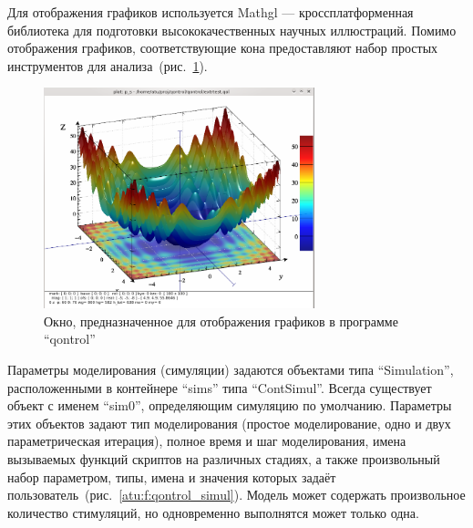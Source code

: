 Для отображения графиков используется
Mathgl ---
кроссплатформенная библиотека для подготовки высококачественных научных иллюстраций.
Помимо отображения графиков, соответствующие кона предоставляют
набор простых инструментов для анализа~(рис.~\ref{atu:f:qontrol_3d}).


\begin{figure}[htb!]
  \begin{center}
    \includegraphics[width=0.7\textwidth]{p/qontrol_3d_a.png}
  \end{center}
  \caption{Окно, предназначенное для отображения графиков в программе ``qontrol''}
  \label{atu:f:qontrol_3d}
\end{figure}

Параметры моделирования (симуляции) задаются объектами типа ``Simulation'',
расположенными в контейнере ``sims'' типа ``ContSimul''.
Всегда существует объект с именем ``sim0'',
определяющим симуляцию по умолчанию.
Параметры этих объектов задают тип моделирования
(простое моделирование, одно и двух параметрическая итерация),
полное время и шаг моделирования,
имена вызываемых функций скриптов на различных стадиях,
а также произвольный набор параметром, типы, имена и значения которых
задаёт пользователь~(рис.~\ref{atu:f:qontrol_simul}).
Модель может содержать произвольное количество стимуляций,
но одновременно выполнятся может только одна.

